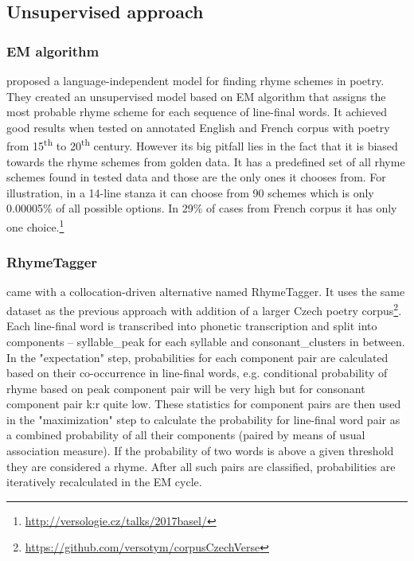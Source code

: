 \subsection{Unsupervised approach}
\subsubsection*{EM algorithm}
\cite{reddy2011unsupervised} proposed a language-independent model for finding rhyme schemes in poetry. They created an unsupervised model based on EM algorithm that assigns the most probable rhyme scheme for each sequence of line-final words. It achieved good results when tested on annotated English and French corpus with poetry from 15\textsuperscript{th} to 20\textsuperscript{th} century. However its big pitfall lies in the fact that it is biased towards the rhyme schemes from golden data. It has a predefined set of all rhyme schemes found in tested data and those are the only ones it chooses from. For illustration, in a 14-line stanza it can choose from 90 schemes which is only 0.00005\% of all possible options. In 29\% of cases from French corpus it has only one choice.\footnote{\url{http://versologie.cz/talks/2017basel/}}

\subsubsection*{RhymeTagger}
\cite{plechavc2018collocation} came with a collocation-driven alternative named RhymeTagger. It uses the same dataset as the previous approach with addition of a larger Czech poetry corpus\footnote{\url{https://github.com/versotym/corpusCzechVerse}}. Each line-final word is transcribed into phonetic transcription and split into components -- \gls{syllable_peak} for each syllable and \gls{consonant_clusters} in between. In the "expectation" step, probabilities for each component pair are calculated based on their co-occurrence in line-final words, e.g. conditional probability of rhyme based on peak component pair  will be very high but for consonant component pair k:r quite low. These statistics for component pairs are then used in the "maximization" step to calculate the probability for line-final word pair as a combined probability of all their components (paired by means of usual association measure). If the probability of two words is above a given threshold they are considered a rhyme. After all such pairs are classified, probabilities are iteratively recalculated in the EM cycle. 

